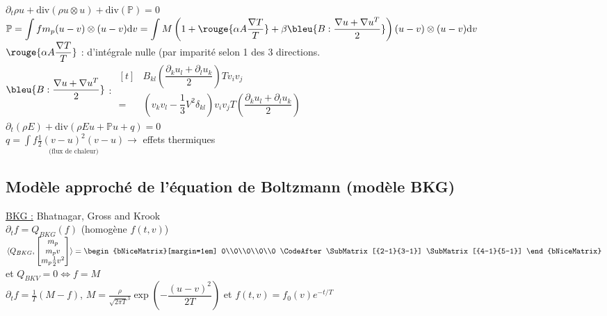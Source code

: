 \documentclass[12pt,a4paper]{article}
\begin{document}
$\partial_t \rho u + \mathrm{div}(\rho u \otimes u) + \mathrm{div}(\mathbb P) = 0$\\
\hspace{1cm} $\mathbb P = \displaystyle\int fm_p (u-v) \otimes (u-v) \mathrm dv = \int M\left(1+\rouge{\alpha A \dfrac{\nabla T}T} + \beta \bleu{B:\dfrac{\nabla u + \nabla u^T}2}\right)(u-v)\otimes (u-v) \mathrm dv$\\

$\rouge{\alpha A \dfrac{\nabla T}T}$ : d'intégrale nulle (par imparité selon 1 des 3 directions.\\

$\bleu{B:\dfrac{\nabla u + \nabla u^T}2}$ : $\begin{aligned}[t]
 &B_{kl}\left(\dfrac{\partial_k u_l +  \partial_l u_k}2\right)Tv_iv_j\\
 =& \left(v_kv_l - \dfrac13 V^2\delta_{kl}\right)v_iv_jT\left(\dfrac{\partial_k u_l + \partial_l u_k}2\right)
\end{aligned}$\\

$\partial_t (\rho E) + \mathrm{div}(\rho E u + \mathbb P u + q) = 0$\\
$q= \displaystyle\underset{\text{(flux de chaleur)}}{\int f\frac12(v-u)^2(v-u)} \to$ effets thermiques
	
\subsection{Modèle approché de l'équation de Boltzmann (modèle BKG)}
	
	
\underline{BKG :} Bhatnagar, Gross and Krook \\

$\partial_t f = Q_{BKG}(f)$ (homogène $f(t,v)$)\\
$\langle Q_{BKG},\begin{bmatrix}
	m_p \\
	m_p v \\
	m_p \frac12 v^2
\end{bmatrix}\rangle = \begin{bNiceMatrix}[margin=1em]
0\\0\\0\\0\\0
\CodeAfter
\SubMatrix[{2-1}{3-1}]
\SubMatrix[{4-1}{5-1}]
\end{bNiceMatrix}$ et $Q_{BKV} = 0 \iff f= M$\\
$\partial_t f = \frac1T (M-f)$, $M = \frac\rho{\sqrt{2\pi T}^3}\exp\left(-\dfrac{(u-v)^2}{2T}\right)$ et $f(t,v) = f_0(v)e^{-t/T}$\\
\end{document}
